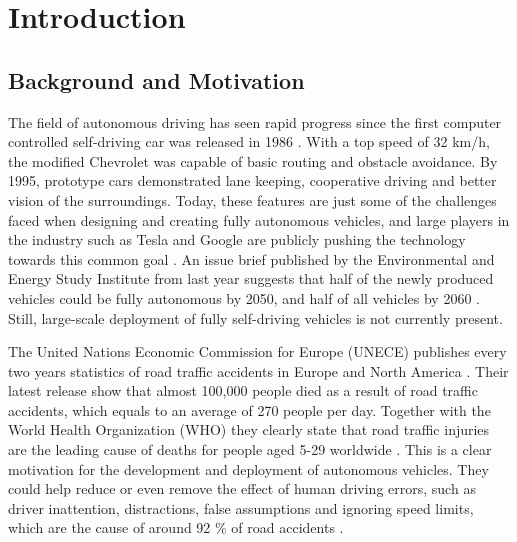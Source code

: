 \chapter{Introduction}

\section{Background and Motivation}
The field of autonomous driving has seen rapid progress since the first computer controlled self-driving car was released in 1986 \cite{AV-history}. With a top speed of 32 km/h, the modified Chevrolet was capable of basic routing and obstacle avoidance. By 1995, prototype cars demonstrated lane keeping, cooperative driving and better vision of the surroundings. Today, these features are just some of the challenges faced when designing and creating fully autonomous vehicles, and large players in the industry such as Tesla and Google are publicly pushing the technology towards this common goal \cite{tesla-ai-day-2022, waymo-cvpr-2022}. An issue brief published by the Environmental and Energy Study Institute from last year suggests that half of the newly produced vehicles could be fully autonomous by 2050, and half of all vehicles by 2060 \cite{eesi-av-climate-solution}. Still, large-scale deployment of fully self-driving vehicles is not currently present.


The United Nations Economic Commission for Europe (UNECE) publishes every two years statistics of road traffic accidents in Europe and North America \cite{UNECE-traffic-accidents-2021}. Their latest release show that almost 100,000 people died as a result of road traffic accidents, which equals to an average of 270 people per day. Together with the World Health Organization (WHO) they clearly state that road traffic injuries are the leading cause of deaths for people aged 5-29 worldwide \cite{WHO-road-safety-report}. This is a clear motivation for the development and deployment of autonomous vehicles. They could help reduce or even remove the effect of human driving errors, such as driver inattention, distractions, false assumptions and ignoring speed limits, which are the cause of around 92 \% of road accidents \cite{towards-connected-autonomous-driving}.

